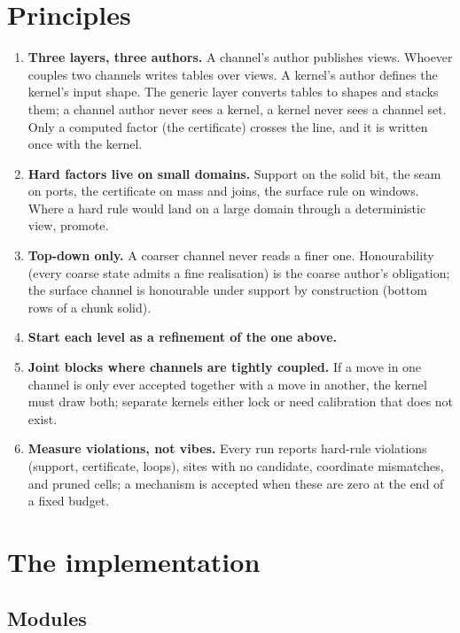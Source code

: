 \documentclass[11pt]{article}
\newcommand{\1}{\mathds{1}}
\begin{document}
\section{Principles}
\label{sec:principles}

\begin{enumerate}
\item \textbf{Three layers, three authors.} A channel's author publishes
  views. Whoever couples two channels writes tables over views. A kernel's
  author defines the kernel's input shape. The generic layer converts
  tables to shapes and stacks them; a channel author never sees a kernel,
  a kernel never sees a channel set. Only a computed factor (the
  certificate) crosses the line, and it is written once with the kernel.
\item \textbf{Hard factors live on small domains.} Support on the solid
  bit, the seam on ports, the certificate on mass and joins, the surface
  rule on windows. Where a hard rule would land on a large domain through
  a deterministic view, promote.
\item \textbf{Top-down only.} A coarser channel never reads a finer one.
  Honourability (every coarse state admits a fine realisation) is the
  coarse author's obligation; the surface channel is honourable under
  support by construction (bottom rows of a chunk solid).
\item \textbf{Start each level as a refinement of the one above.}
\item \textbf{Joint blocks where channels are tightly coupled.} If a
  move in one channel is only ever accepted together with a move in
  another, the kernel must draw both; separate kernels either lock or
  need calibration that does not exist.
\item \textbf{Measure violations, not vibes.} Every run reports hard-rule
  violations (support, certificate, loops), sites with no candidate,
  coordinate mismatches, and pruned cells; a mechanism is accepted when
  these are zero at the end of a fixed budget.
\end{enumerate}

\section{The implementation}
\label{sec:impl}

\subsection{Modules}
\end{document}
